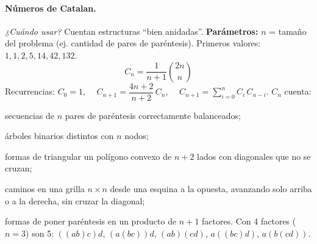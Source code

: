 \paragraph{Números de Catalan.} \textit{¿Cuándo usar?} Cuentan estructuras ``bien anidadas''. \textbf{Parámetros:} \(n\) = tamaño del problema (ej. cantidad de pares de paréntesis). Primeros valores: \(1, 1, 2, 5, 14, 42, 132\).
\[
C_n=\frac{1}{n+1}\binom{2n}{n}
\]
Recurrencias: \(C_0 = 1\), \(\quad C_{n+1}=\dfrac{4n+2}{n+2}\,C_n\), \(\quad C_{n+1}=\displaystyle\sum_{i=0}^{n} C_i\,C_{n-i}\). \(C_n\) cuenta:
\begin{props}
  \item secuencias de \(n\) pares de paréntesis correctamente balanceados;
  \item árboles binarios distintos con \(n\) nodos;
  \item formas de triangular un polígono convexo de \(n+2\) lados con diagonales que no se cruzan;
  \item caminos en una grilla \(n \times n\) desde una esquina a la opuesta, avanzando solo arriba o a la derecha, sin cruzar la diagonal;
  \item formas de poner paréntesis en un producto de \(n+1\) factores. Con 4 factores (\(n=3\)) son 5: \(((ab)c)d\), \((a(bc))d\), \((ab)(cd)\), \(a((bc)d)\), \(a(b(cd))\).
\end{props}
